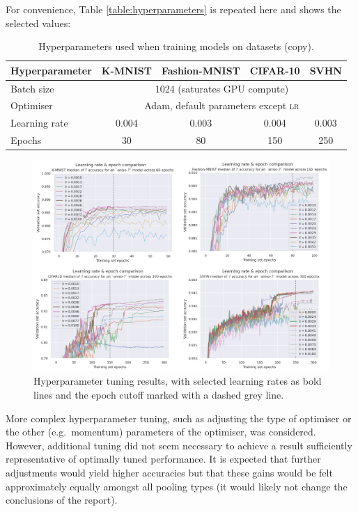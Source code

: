 \documentclass[a4paper, 12pt]{report}
\begin{document}
For convenience, Table \ref{table:hyperparameters} is repeated here and shows the selected values:

\begin{table}[!htbp]
\centering
\begin{tabular}{l|*4c}
\toprule
Hyperparameter & K-MNIST & Fashion-MNIST & CIFAR-10 & SVHN\\
\midrule
Batch size & \multicolumn{4}{c}{1024 (saturates GPU compute)}\\
Optimiser   &  \multicolumn{4}{c}{Adam, default parameters except \textsc{lr}} \\
Learning rate & 0.004 & 0.003 & 0.004 & 0.003 \\
Epochs & 30 & 80 & 150 & 250 \\
\bottomrule
\end{tabular}
\caption{Hyperparameters used when training models on datasets (copy).}
\end{table}

\begin{figure}[h!]
	\center
  \includegraphics[width=\textwidth]{figures/learning_rates.png}
  \caption{Hyperparameter tuning results, with selected learning rates as bold lines and the epoch cutoff marked with a dashed grey line.}
  \label{fig:tuning}
\end{figure}

\noindent
More complex hyperparameter tuning, such as adjusting the type of optimiser or the other (e.g.\ momentum) parameters of the optimiser, was considered. However, additional tuning did not seem necessary to achieve a result sufficiently representative of optimally tuned performance. It is expected that further adjustments would yield higher accuracies but that these gains would be felt approximately equally amongst all pooling types (it would likely not change the conclusions of the report).
\end{document}
